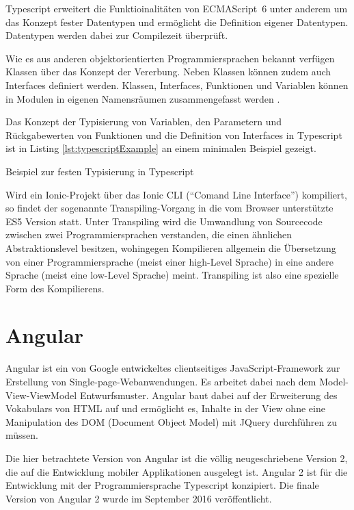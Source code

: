 Typescript erweitert die Funktioinalitäten von ECMAScript~6 unter anderem um das Konzept fester Datentypen und ermöglicht die Definition eigener Datentypen. Datentypen werden dabei zur Compilezeit überprüft.

Wie es aus anderen objektorientierten Programmiersprachen bekannt verfügen Klassen über das Konzept der Vererbung. Neben Klassen können zudem auch Interfaces definiert werden. Klassen, Interfaces, Funktionen und Variablen können in Modulen in eigenen Namensräumen zusammengefasst werden \cite{MicrosoftTypescriptDoku}.

Das Konzept der Typisierung von Variablen, den Parametern und Rückgabewerten von Funktionen und die Definition von Interfaces in Typescript ist in Listing \ref{lst:typescriptExample} an einem minimalen Beispiel gezeigt.

\begin{listing}[htb]
    
    \caption{Beispiel zur festen Typisierung in Typescript}
    \label{lst:typescriptExample}
\end{listing}

Wird ein Ionic-Projekt über das Ionic CLI (\enquote{Comand Line Interface}) kompiliert, so findet der sogenannte Transpiling-Vorgang in die vom Browser unterstützte ES5 Version statt. Unter Transpiling wird die Umwandlung von Sourcecode zwischen zwei Programmiersprachen verstanden, die einen ähnlichen Abstraktionslevel besitzen, wohingegen Kompilieren allgemein die Übersetzung von einer Programmiersprache (meist einer high-Level Sprache) in eine andere Sprache (meist eine low-Level Sprache) meint. Transpiling ist also eine spezielle Form des Kompilierens.
%
%
\section{Angular}
\label{sec:Angular}
%
Angular ist ein von Google entwickeltes clientseitiges JavaScript-Framework zur Erstellung von Single-page-Webanwendungen. Es arbeitet dabei nach dem Model-View-ViewModel Entwurfsmuster. Angular baut dabei auf der Erweiterung des Vokabulars von HTML auf und ermöglicht es, Inhalte in der View ohne eine Manipulation des DOM (Document Object Model) mit JQuery durchführen zu müssen. 

Die hier betrachtete Version von Angular ist die völlig neugeschriebene Version 2, die auf die Entwicklung mobiler Applikationen ausgelegt ist. Angular 2 ist für die Entwicklung mit der Programmiersprache Typescript konzipiert. Die finale Version von Angular 2 wurde im September 2016 veröffentlicht.
%

